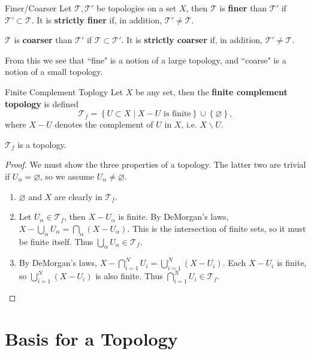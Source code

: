 \documentclass[10pt]{report}
\begin{document}
\begin{defn}{Finer/Coarser}{}
	Let $\mathcal{T},\mathcal{T}'$ be topologies on a set $X$, then $\mathcal{T}$ is \textbf{finer} than $\mathcal{T}'$ if $\mathcal{T}' \subset \mathcal{T}$. It is \textbf{strictly finer} if, in addition, $\mathcal{T}' \neq \mathcal{T}$.

	$\mathcal{T}$ is \textbf{coarser} than $\mathcal{T}'$ if $\mathcal{T} \subset \mathcal{T}'$. It is \textbf{strictly coarser} if, in addition, $\mathcal{T}' \neq \mathcal{T}$.
\end{defn}

From this we see that ``fine" is a notion of a large topology, and ``coarse" is a notion of a small topology.

\begin{ex}{Finite Complement Toplogy}{}
	Let $X$ be any set, then the \textbf{finite complement topology} is defined
	\[
		\mathcal{T}_f = \left\{ U \subset X \;|\; X-U \text{ is finite} \right\} \cup\left\{ \varnothing \right\},
	\] 
	where $X-U$ denotes the complement of $U$ in $X$, i.e. $X \backslash U$.
\end{ex}
\begin{prop}
	$\mathcal{T}_f$ is a topology.
\end{prop}
\begin{proof}
	We must show the three properties of a topology. The latter two are trivial if $U_\alpha=\varnothing$, so we assume $U_\alpha\neq \varnothing$.
	\begin{enumerate}
		\item $\varnothing$ and $X$ are clearly in $\mathcal{T}_f$.
		\item Let $U_\alpha \in \mathcal{T}_f$, then $X- U_\alpha$ is finite. By DeMorgan's laws, $X- \bigcup_\alpha U_\alpha = \bigcap_\alpha (X- U_{\alpha})$. This is the intersection of finite sets, so it must be finite itself. Thus $\bigcup_{\alpha} U_\alpha \in \mathcal{T}_f$.
		\item By DeMorgan's laws, $X-\bigcap_{i=1}^N U_i = \bigcup_{i=1}^N (X- U_i)$. Each $X- U_i$ is finite, so $\bigcup_{i=1}^N (X- U_i)$ is also finite. Thus $\bigcap_{i=1}^N U_i \in \mathcal{T}_f$.
	\end{enumerate}
\end{proof}


\section{Basis for a Topology}
\end{document}
